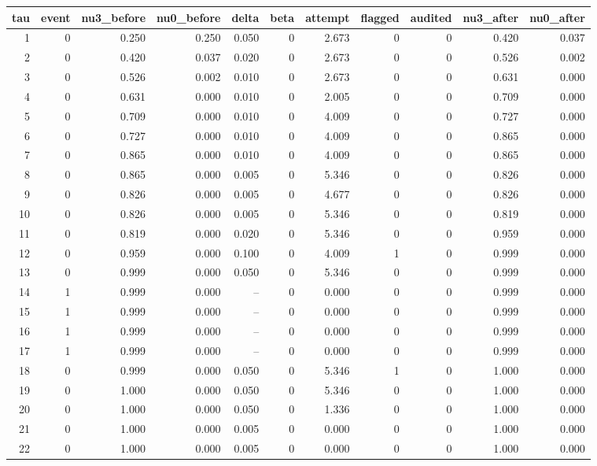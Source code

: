 \begin{tabular}{rrrrrrrrrrr}
\toprule
tau & event & nu3_before & nu0_before & delta & beta & attempt & flagged & audited & nu3_after & nu0_after \\
\midrule
1 & 0 & 0.250 & 0.250 & 0.050 & 0 & 2.673 & 0 & 0 & 0.420 & 0.037 \\
2 & 0 & 0.420 & 0.037 & 0.020 & 0 & 2.673 & 0 & 0 & 0.526 & 0.002 \\
3 & 0 & 0.526 & 0.002 & 0.010 & 0 & 2.673 & 0 & 0 & 0.631 & 0.000 \\
4 & 0 & 0.631 & 0.000 & 0.010 & 0 & 2.005 & 0 & 0 & 0.709 & 0.000 \\
5 & 0 & 0.709 & 0.000 & 0.010 & 0 & 4.009 & 0 & 0 & 0.727 & 0.000 \\
6 & 0 & 0.727 & 0.000 & 0.010 & 0 & 4.009 & 0 & 0 & 0.865 & 0.000 \\
7 & 0 & 0.865 & 0.000 & 0.010 & 0 & 4.009 & 0 & 0 & 0.865 & 0.000 \\
8 & 0 & 0.865 & 0.000 & 0.005 & 0 & 5.346 & 0 & 0 & 0.826 & 0.000 \\
9 & 0 & 0.826 & 0.000 & 0.005 & 0 & 4.677 & 0 & 0 & 0.826 & 0.000 \\
10 & 0 & 0.826 & 0.000 & 0.005 & 0 & 5.346 & 0 & 0 & 0.819 & 0.000 \\
11 & 0 & 0.819 & 0.000 & 0.020 & 0 & 5.346 & 0 & 0 & 0.959 & 0.000 \\
12 & 0 & 0.959 & 0.000 & 0.100 & 0 & 4.009 & 1 & 0 & 0.999 & 0.000 \\
13 & 0 & 0.999 & 0.000 & 0.050 & 0 & 5.346 & 0 & 0 & 0.999 & 0.000 \\
14 & 1 & 0.999 & 0.000 & -- & 0 & 0.000 & 0 & 0 & 0.999 & 0.000 \\
15 & 1 & 0.999 & 0.000 & -- & 0 & 0.000 & 0 & 0 & 0.999 & 0.000 \\
16 & 1 & 0.999 & 0.000 & -- & 0 & 0.000 & 0 & 0 & 0.999 & 0.000 \\
17 & 1 & 0.999 & 0.000 & -- & 0 & 0.000 & 0 & 0 & 0.999 & 0.000 \\
18 & 0 & 0.999 & 0.000 & 0.050 & 0 & 5.346 & 1 & 0 & 1.000 & 0.000 \\
19 & 0 & 1.000 & 0.000 & 0.050 & 0 & 5.346 & 0 & 0 & 1.000 & 0.000 \\
20 & 0 & 1.000 & 0.000 & 0.050 & 0 & 1.336 & 0 & 0 & 1.000 & 0.000 \\
21 & 0 & 1.000 & 0.000 & 0.005 & 0 & 0.000 & 0 & 0 & 1.000 & 0.000 \\
22 & 0 & 1.000 & 0.000 & 0.005 & 0 & 0.000 & 0 & 0 & 1.000 & 0.000 \\

\end{tabular}
